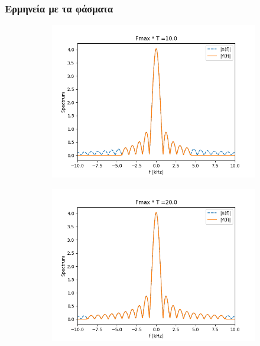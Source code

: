 \documentclass[9pt]{beamer}
\begin{document}
	\begin{frame}
	\frametitle{Ερμηνεία με τα φάσματα}
	\begin{figure}
		\begin{subfigure}{0.49\linewidth}
			\includegraphics[width=\linewidth]{BT10s}
		\end{subfigure}
		\begin{subfigure}{0.49\linewidth}
			\includegraphics[width=\linewidth]{BT20s}	
		\end{subfigure}		
	\end{figure}
	\end{frame}
\end{document}
